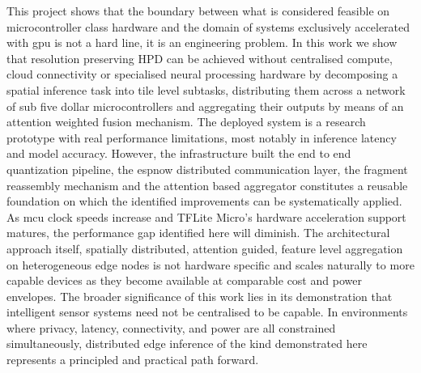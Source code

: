 This project shows that the boundary between what is considered feasible on microcontroller class hardware and the domain of systems exclusively accelerated with \gls{gpu} is not a hard line, it is an engineering problem. In this work we show that resolution preserving HPD can be achieved without centralised compute, cloud connectivity or specialised neural processing hardware by decomposing a spatial inference task into tile level subtasks, distributing them across a network of sub five dollar microcontrollers and aggregating their outputs by means of an attention weighted fusion mechanism.
The deployed system is a research prototype with real performance limitations, most notably in inference latency and model accuracy. However, the infrastructure built the end to end quantization pipeline, the \gls{espnow} distributed communication layer, the fragment reassembly mechanism and the attention based aggregator constitutes a reusable foundation on which the identified improvements can be systematically applied. As \gls{mcu} clock speeds increase and TFLite Micro’s hardware acceleration support matures, the performance gap identified here will diminish. The architectural approach itself, spatially distributed, attention guided, feature level aggregation on heterogeneous edge nodes is not hardware specific and scales naturally to more capable devices as they become available at comparable cost and power envelopes.
The broader significance of this work lies in its demonstration that intelligent sensor systems need not be centralised to be capable. In environments where privacy, latency, connectivity, and power are all constrained simultaneously, distributed edge inference of the kind demonstrated here represents a principled and practical path forward.
